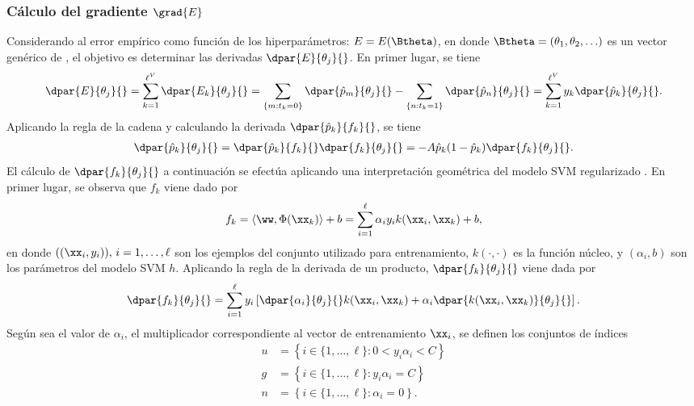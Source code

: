 %
\subsubsection{Cálculo del gradiente $\grad{E}$}
\label{se:gradE}
%
Considerando al error empírico como función de los hiperparámetros:
$E=E(\Btheta)$, en donde $\Btheta=(\theta_1,\theta_2,\ldots)$ es un
vector genérico de , el objetivo es determinar las derivadas
$\dpar{E}{\theta_j}{}$.
En primer lugar, se tiene
%
\begin{align}
\label{gradE}
  \dpar{E}{\theta_j}{} = \sum_{k=1}^{\ell^V} \dpar{E_k}{\theta_j}{} =
  \sum_{ \{m:t_k=0\}  } \dpar{\hat{p}_m}{\theta_j}{}
  - \sum_{ \{n:t_k=1\}  } \dpar{\hat{p}_n}{\theta_j}{}
  = \sum_{k=1}^{\ell^V} y_k \dpar{\hat{p}_k}{\theta_j}{}.
\end{align}
%
Aplicando la regla de la cadena y calculando la derivada
$\dpar{\hat{p}_k}{f_k}{}$, se tiene
%
\begin{align}
  \dpar{\hat{p}_k}{\theta_j}{} =
  \dpar{\hat{p}_k}{f_k}{}\dpar{f_k}{\theta_j}{} =
  -A\hat{p}_k(1-\hat{p}_k)\dpar{f_k}{\theta_j}{}.
  \label{eq:deriv-pk-thetaj}
\end{align}
%
El cálculo de $\dpar{f_k}{\theta_j}{}$ a continuación se efectúa
aplicando una interpretación geométrica del modelo SVM regularizado
\cite{keerthi,glasmachers,shark}.
En primer lugar, se observa que $f_k$ viene dado por
%
\begin{align}
  f_k = \langle \ww,\Phi(\xx_k)\rangle+b
      = \sum_{i=1}^\ell \alpha_i y_i k(\xx_i,\xx_k) + b,
  \label{fk}
\end{align}
%
en donde $((\xx_i,y_i)),\,i=1,\ldots,\ell$ son los ejemplos del
conjunto utilizado para entrenamiento, $k(\cdot,\cdot)$ es la función
núcleo, y $(\alpha_i, b)$ son los parámetros del modelo SVM $h$.
Aplicando la regla de la derivada de un producto,
$\dpar{f_k}{\theta_j}{}$ viene dada por
\begin{align}
  \dpar{f_k}{\theta_j}{} = \sum_{i=1}^\ell y_i
  \left[\dpar{\alpha_i}{\theta_j}{} k(\xx_i,\xx_k) + \alpha_i
    \dpar{k(\xx_i,\xx_k)}{\theta_j}{} \right].
\end{align}
%
Según sea el valor de $\alpha_i$, el multiplicador correspondiente al
vector de entrenamiento $\xx_i$, se definen los conjuntos de índices
%
\begin{align}
  \label{unbounded-sv-set}
  u &= \left\{i\in\{1,\ldots,\ell\}:0<y_i\alpha_i<C \right\}\\
  \label{bounded-sv-set}
  g &= \left\{i\in\{1,\ldots,\ell\}: y_i\alpha_i=C \right\}\\
  n &= \left\{i\in\{1,\ldots,\ell\}: \alpha_i=0 \right\}.
\end{align}

